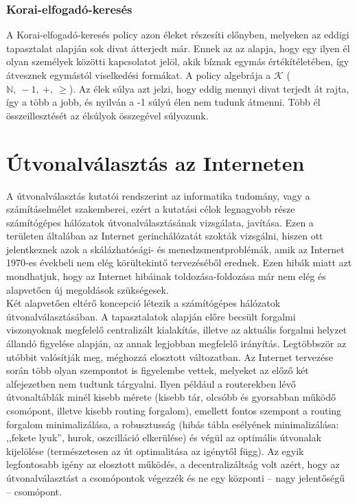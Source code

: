       \subsubsection{Korai-elfogadó-keresés}\label{korai_elfogado_kereses}
      A Korai-elfogadó-keresés policy azon éleket részesíti előnyben, melyeken az eddigi tapasztalat alapján sok divat átterjedt már. Ennek az az alapja, hogy egy ilyen él olyan személyek közötti kapcsolatot jelöl, akik bíznak egymás értékítéletében, így átvesznek egymástól viselkedési formákat. A policy algebrája a $\mathcal{K}$ ($\mathbb{N},~-1,~+,~\geq$). Az élek súlya azt jelzi, hogy eddig mennyi divat terjedt át rajta, így a több a jobb, és nyilván a -1 súlyú élen nem tudunk átmenni. Több él összeillesztését az élsúlyok összegével súlyozunk.

  \section{Útvonalválasztás az Interneten}
  A útvonalválasztás kutatói rendszerint az informatika tudomány, vagy a számításelmélet szakemberei, ezért a kutatási célok legnagyobb része számítógépes hálózatok útvonalválasztásának vizsgálata, javítása. Ezen a területen általában az Internet gerinchálózatát szokták vizsgálni, hiszen ott jelentkeznek azok a skálázhatósági- és menedzsmentproblémák, amik az Internet 1970-es évekbeli nem elég körültekintő tervezéséből erednek. Ezen hibák miatt azt mondhatjuk, hogy az Internet hibáinak toldozása-foldozása már nem elég és alapvetően új megoldások szükségesek.\\

  Két alapvetően eltérő koncepció létezik a számítógépes hálózatok útvonalválasztásában. A tapasztalatok alapján előre becsült forgalmi viszonyoknak megfelelő centralizált kialakítás, illetve az aktuális forgalmi helyzet állandó figyelése alapján, az annak legjobban megfelelő irányítás. Legtöbbször az utóbbit valósítják meg, méghozzá elosztott változatban. Az Internet tervezése során több olyan szempontot is figyelembe vettek, melyeket az előző két alfejezetben nem tudtunk tárgyalni. Ilyen például a routerekben lévő útvonaltáblák minél kisebb mérete (kisebb tár, olcsóbb és gyorsabban működő csomópont, illetve kisebb routing forgalom), emellett fontos szempont a routing forgalom minimalizálása, a robusztusság (hibás tábla esélyének minimalizálása: ,,fekete lyuk'', hurok, oszcilláció elkerülése) és végül az optimális útvonalak kijelölése (természetesen az út optimalitása az igénytől függ). Az egyik legfontosabb igény az elosztott működés, a decentralizáltság volt azért, hogy az útvonalválasztást a csomópontok végezzék és ne egy központi -- nagy jelentőségű -- csomópont.\\

